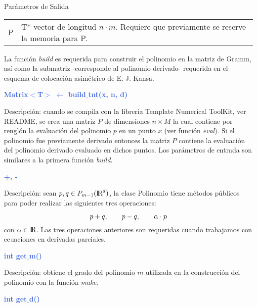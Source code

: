 \documentclass[a4paper,11pt]{article}
\newcommand \RR{\hbox{I\kern -.2em \hbox {R}}}
\begin{document}
{{{{{\noindent
Par\'ametros de Salida

\begin{tabular}{ll}
    P  &  T*  vector de longitud $n \cdot m$. Requiere que previamente se reserve la memoria para P.
\end{tabular}

\noindent
La funci\'on \textit{build} es requerida para construir el polinomio en la matriz de Gramm, as\'i como
la submatriz -corresponde al polinomio derivado- requerida en el esquema de colocaci\'on asim\'etrico de E. J. Kansa.


\vspace{7mm}
\noindent
{\textcolor{RoyalBlue}{ \textbf{ Matrix$<$T$>$ $\leftarrow$ build$\_$tnt(x, n, d)  } }

\noindent
Descripci\'on: cuando se compila con la libreria Template Numerical ToolKit, ver README,
se crea una matriz $P$ de dimensiones $n \times M$ la cual contiene por rengl\'on
la evaluaci\'on del polinomio $p$ en un punto $x$ (ver funci\'on \textit{eval}).
Si el polinomio fue previamente derivado entonces la matriz $P$ contiene la evaluaci\'on del
polinomio derivado evaluado en dichos puntos. Los par\'ametros de entrada son similares
a la primera funci\'on \textit{build}.

\vspace{7mm}
\noindent
{\textcolor{RoyalBlue}{ \textbf{+, -} }

\noindent
Descripci\'on: sean $p,q  \in P_{m-1}(\RR^d)$,  la clase Polinomio tiene m\'etodos p\'ublicos
para poder realizar las siguientes tres operaciones:

\[
  p + q, \hspace{7mm}
  p - q, \hspace{7mm}
 \alpha \cdot p
\]
con $\alpha \in \RR$. Las tres operaciones anteriores son requeridas cuando trabajamos con ecuaciones
en derivadas parciales.


\vspace{7mm}
\noindent
{\textcolor{RoyalBlue}{\textbf{ int get$\_$m()  } }

\noindent
Descripci\'on: obtiene el grado del polinomio $m$ utilizada
en la construcci\'on del polinomio con la funci\'on \textit{make}.

\vspace{7mm}
\noindent
{\textcolor{RoyalBlue}{\textbf{ int get$\_$d()  } }

}}}}}}}}}
\end{document}
